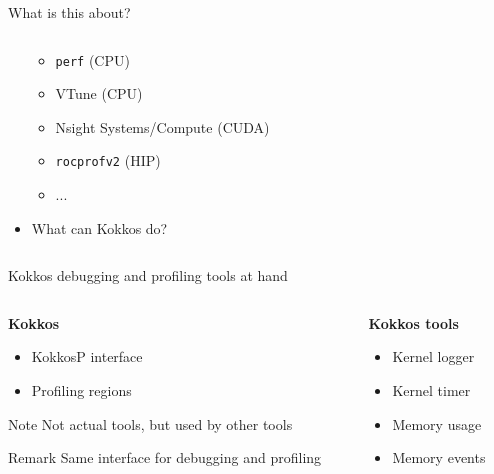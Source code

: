 \documentclass[
    aspectratio=169,
    \createHandout
]{beamer}
\begin{document}
\begin{frame}{What is this about?}
\begin{columns}[T]
\begin{column}{0.5\linewidth}
\begin{itemize}
\begin{itemize}
                    \item \texttt{perf} (CPU)
                    \item VTune (CPU)
                    \item Nsight Systems/Compute (CUDA)
                    \item \texttt{rocprofv2} (HIP)
                    \item ...
                \end{itemize}
                \item What can Kokkos do?
            \end{itemize}
        \end{column}
    \end{columns}
\end{frame}

\begin{frame}{Kokkos debugging and profiling tools at hand}
    \begin{columns}[T]
        \begin{column}{0.33\linewidth}
            \begin{center}
                \textbf{Kokkos}
            \end{center}
            \begin{itemize}
                \item KokkosP interface
                \item Profiling regions
            \end{itemize}
            \begin{block}{Note}
                Not actual tools, but used by other tools
            \end{block}
            \begin{block}{Remark}
                Same interface for debugging and profiling
            \end{block}
        \end{column}
        \pause
        \begin{column}{0.33\linewidth}
            \begin{center}
                \textbf{Kokkos tools}
            \end{center}
            \begin{itemize}
                \item Kernel logger
                \item Kernel timer
                \item Memory usage
                \item Memory events

\end{itemize}
\end{column}
\end{columns}
\end{frame}
\end{document}
